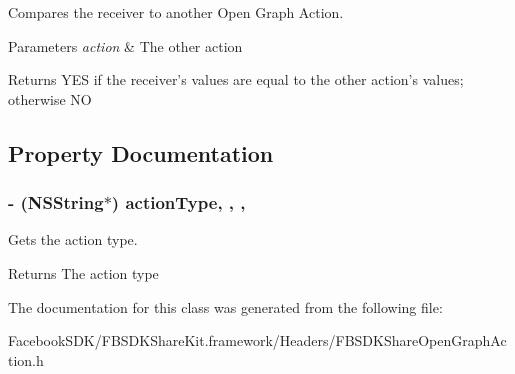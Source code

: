 Compares the receiver to another Open Graph Action. 
\begin{DoxyParams}{Parameters}
{\em action} & The other action \\
\hline
\end{DoxyParams}
\begin{DoxyReturn}{Returns}
Y\-E\-S if the receiver's values are equal to the other action's values; otherwise N\-O 
\end{DoxyReturn}


\subsection{Property Documentation}
\hypertarget{interface_f_b_s_d_k_share_open_graph_action_ae9d368ff0aa61e07a34cf9891244e0f9}{
\subsubsection[{action\-Type}]{\setlength{\rightskip}{0pt plus 5cm}-\/ (N\-S\-String$\ast$) action\-Type\hspace{0.3cm}{\ttfamily [read]}, {\ttfamily [write]}, {\ttfamily [nonatomic]}, {\ttfamily [copy]}}}\label{interface_f_b_s_d_k_share_open_graph_action_ae9d368ff0aa61e07a34cf9891244e0f9}
Gets the action type. \begin{DoxyReturn}{Returns}
The action type 
\end{DoxyReturn}


The documentation for this class was generated from the following file\-:\begin{DoxyCompactItemize}
\item 
Facebook\-S\-D\-K/\-F\-B\-S\-D\-K\-Share\-Kit.\-framework/\-Headers/F\-B\-S\-D\-K\-Share\-Open\-Graph\-Action.\-h\end{DoxyCompactItemize}
